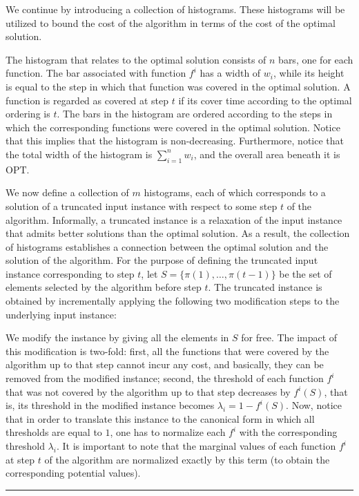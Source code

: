 \documentclass[11pt]{article}
\theoremstyle{plain}
\theoremstyle{definition}
\newcommand{\qedsymb}{\hfill{\rule{2mm}{2mm}}}
\renewenvironment{proof}{\begin{trivlist} \item[\hspace{\labelsep}{\bf \noindent Proof.\/}] }{\qedsymb\end{trivlist}}\newenvironment{proofof}[1]{\begin{trivlist} \item[\hspace{\labelsep}{\bf \noindent Proof of #1.\/}] }{\qedsymb\end{trivlist}}\newenvironment{MyEqn}[1]{\setlength\arraycolsep{2pt}\begin{eqnarray*} #1}{\end{eqnarray*}}
\newcommand{\opt}{\mathrm{OPT}}
\begin{document}
\begin{proof}
We continue by introducing a collection of histograms. These
histograms will be utilized to bound the cost of the algorithm in
terms of the cost of the optimal solution.

\smallskip {}
The histogram that relates to the optimal solution consists of $n$
bars, one for each function. The bar associated with function
$f^i$ has a width of $w_i$, while its height is equal to the step
in which that function was covered in the optimal solution. A
function is regarded as covered at step $t$ if its cover time
according to the optimal ordering is $t$. The bars in the
histogram are ordered according to the steps in which the
corresponding functions were covered in the optimal solution.
Notice that this implies that the histogram is non-decreasing.
Furthermore, notice that the total width of the histogram is
$\sum_{i=1}^n w_i$, and the overall area beneath it is $\opt$.

\medskip {}
We now define a collection of $m$ histograms, each of which
corresponds to a solution of a truncated input instance with
respect to some step $t$ of the algorithm. Informally, a truncated
instance is a relaxation of the input instance that admits better
solutions than the optimal solution. As a result, the collection
of histograms establishes a connection between the optimal
solution and the solution of the algorithm. For the purpose of
defining the truncated input instance corresponding to step $t$,
let $S = \{ \pi(1), \ldots, \pi(t - 1) \}$ be the set of elements
selected by the algorithm before step $t$. The truncated instance
is obtained by incrementally applying the following two
modification steps to the underlying input instance:

 We modify
the instance by giving all the elements in $S$ for free. The
impact of this modification is two-fold: first, all the functions
that were covered by the algorithm up to that step cannot incur
any cost, and basically, they can be removed from the modified
instance; second, the threshold of each function $f^i$ that was
not covered by the algorithm up to that step decreases by
$f^i(S)$, that is, its threshold in the modified instance becomes
$\lambda_i = 1 - f^i(S)$. Now, notice that in order to translate
this instance to the canonical form in which all thresholds are
equal to $1$, one has to normalize each $f^i$ with the
corresponding threshold $\lambda_i$. It is important to note that
the marginal values of each function $f^i$ at step $t$ of the
algorithm are normalized exactly by this term (to obtain the
corresponding potential values).


\end{proof}
\end{document}
